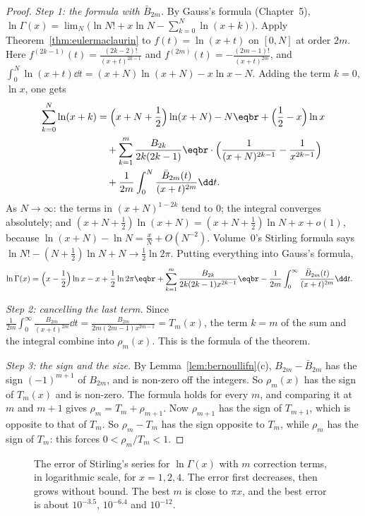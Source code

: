 \begin{proof}
\emph{Step 1: the formula with $\bar B_{2m}$.} By Gauss's formula (Chapter~5), $\ln\Gamma(x)=\lim_N\bigl(\ln N!+x\ln N-\sum_{k=0}^N\ln(x+k)\bigr)$. Apply
Theorem~\ref{thm:eulermaclaurin} to $f(t)=\ln(x+t)$ on $[0,N]$ at order $2m$. Here $f^{(2k-1)}(t)=\frac{(2k-2)!}{(x+t)^{2k-1}}$ and $f^{(2m)}(t)=-\frac{(2m-1)!}{(x+t)^{2m}}$, and
$\int_0^N\ln(x+t)\dd t=(x+N)\ln(x+N)-x\ln x-N$. Adding the term $k=0$, $\ln x$, one gets
\[
\begin{aligned}\sum_{k=0}^N\ln(x+k)&=\Bigl(x+N+\frac12\Bigr)\ln(x+N)-N\eqbr+\Bigl(\frac12-x\Bigr)\ln x\\
&\quad+\sum_{k=1}^m\frac{B_{2k}}{2k(2k-1)}\eqbr\cdot\Bigl(\frac1{(x+N)^{2k-1}}-\frac1{x^{2k-1}}\Bigr)\\
&\quad+\frac1{2m}\int_0^N\frac{\bar B_{2m}(t)}{(x+t)^{2m}}\dd t.\end{aligned}
\]
As $N\to\infty$: the terms in $(x+N)^{1-2k}$ tend to $0$; the integral converges absolutely; and
$(x+N+\frac12)\ln(x+N)=(x+N+\frac12)\ln N+x+o(1)$, because $\ln(x+N)-\ln N=\frac xN+O(N^{-2})$. Volume~0's Stirling formula says
$\ln N!-(N+\frac12)\ln N+N\to\frac12\ln2\pi$. Putting everything into Gauss's formula,
\[
\begin{aligned}\ln\Gamma(x)&=\Bigl(x-\frac12\Bigr)\ln x-x+\frac12\ln2\pi\eqbr+\sum_{k=1}^m\frac{B_{2k}}{2k(2k-1)x^{2k-1}}\eqbr-\frac1{2m}\int_0^\infty\frac{\bar B_{2m}(t)}{(x+t)^{2m}}\dd t.\end{aligned}
\]

\emph{Step 2: cancelling the last term.} Since $\frac1{2m}\int_0^\infty\frac{B_{2m}}{(x+t)^{2m}}\dd t=\frac{B_{2m}}{2m(2m-1)x^{2m-1}}=T_m(x)$, the term $k=m$ of the sum and the
integral combine into $\rho_m(x)$. This is the formula of the theorem.

\emph{Step 3: the sign and the size.} By Lemma~\ref{lem:bernoullifn}(c), $B_{2m}-\bar B_{2m}$ has the sign $(-1)^{m+1}$ of $B_{2m}$, and is non-zero
off the integers. So $\rho_m(x)$ has the sign of $T_m(x)$ and is non-zero. The formula holds for every $m$, and comparing it at $m$ and $m+1$ gives
$\rho_m=T_m+\rho_{m+1}$. Now $\rho_{m+1}$ has the sign of $T_{m+1}$, which is opposite to that of $T_m$. So $\rho_m-T_m$ has the sign opposite to
$T_m$, while $\rho_m$ has the sign of $T_m$: this forces $0<\rho_m/T_m<1$.
\end{proof}

\begin{figure}[ht]
\centering
{}
\caption{The error of Stirling's series for $\ln\Gamma(x)$ with $m$ correction terms, in logarithmic scale, for $x=1,2,4$. The error first decreases, then
grows without bound. The best $m$ is close to $\pi x$, and the best error is about $10^{-3.5}$, $10^{-6.4}$ and $10^{-12}$.}
\label{fig:stirlingerr}
\end{figure}

